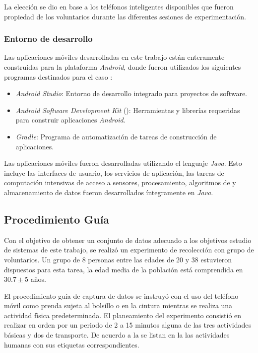 La elección se dio en base a los teléfonos inteligentes disponibles
que fueron propiedad de los voluntarios durante las diferentes sesiones
de experimentación.

\subsubsection{Entorno de desarrollo }

Las aplicaciones móviles desarrolladas en este trabajo están enteramente
construidas para la plataforma \emph{Android}, donde fueron utilizados
los siguientes programas destinados para el caso \cite{Android2016}:
\begin{itemize}
\item \emph{Android Studio}: Entorno de desarrollo integrado para proyectos\emph{
}de software.
\item \emph{Android} \emph{Software Development Kit }(): Herramientas
y librerías  requeridas para construir aplicaciones \emph{Android}.
\item \emph{Gradle}: Programa de automatización de tareas de construcción
de aplicaciones.
\end{itemize}
Las aplicaciones móviles fueron desarrolladas utilizando el lenguaje
\emph{Java}. Esto incluye las interfaces de usuario, los servicios
de aplicación, las tareas de computación intensivas de acceso a sensores,
procesamiento, algoritmos de  y almacenamiento de datos
fueron desarrollados íntegramente en \emph{Java}.

\subsection{Procedimiento Guía }

Con el objetivo de obtener un conjunto de datos adecuado a los objetivos
estudio de sistemas  de este trabajo, se realizó un experimento
de recolección con grupo de voluntarios. Un grupo de 8 personas entre
las edades de 20 y 38 estuvieron dispuestos para esta tarea, la edad
media de la población está comprendida en $30.7\pm5$ años. 

El procedimiento guía de captura de datos se instruyó con el uso del
teléfono móvil como prenda sujeta al bolsillo o en la cintura mientras
se realiza una actividad física predeterminada. El planeamiento del
experimento consistió en realizar en orden por un periodo de 2 a 15
minutos alguna de las tres actividades básicas y dos de transporte.
De acuerdo a la  se listan en la 
las actividades humanas con sus etiquetas correspondientes.

